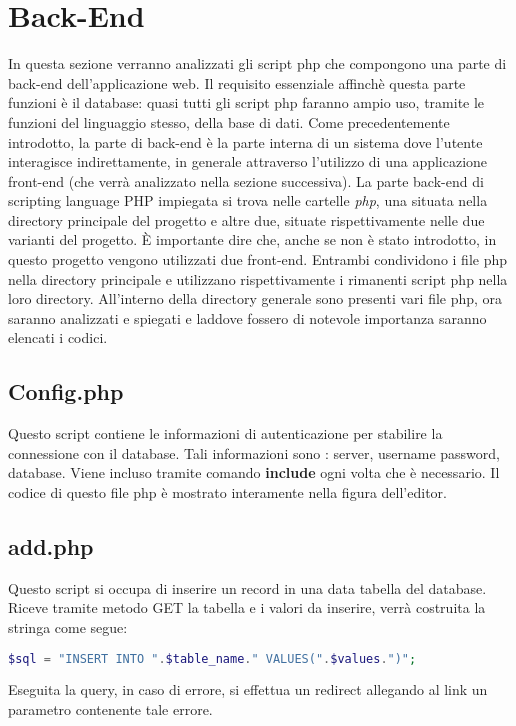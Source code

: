 \section{Back-End}
In questa sezione verranno analizzati gli script php che compongono una parte di back-end dell'applicazione web. \newline
Il requisito essenziale affinchè questa parte funzioni è il database: quasi tutti gli script php faranno ampio uso, tramite le funzioni del linguaggio stesso, della base di dati. \newline \newline
Come precedentemente introdotto, la parte di back-end è la parte interna di un sistema dove l'utente interagisce indirettamente, in generale attraverso l'utilizzo di una applicazione front-end (che verrà analizzato nella sezione successiva). \newline
La parte back-end di scripting language PHP impiegata si trova nelle cartelle \textit{php}, una situata nella directory principale del progetto e altre due, situate rispettivamente nelle due varianti del progetto. \newline
È importante dire che, anche se non è stato introdotto, in questo progetto vengono utilizzati due front-end. Entrambi condividono i file php nella directory principale e utilizzano rispettivamente i rimanenti script php nella loro directory.
\newline
All'interno della directory generale sono presenti vari file php, ora saranno analizzati e spiegati e laddove fossero di notevole importanza saranno elencati i codici.


\subsection{Config.php}
Questo script contiene le informazioni di autenticazione per stabilire la connessione con il database. Tali informazioni sono : server, username password, database.\newline
Viene incluso tramite comando \textbf{include} ogni volta che è necessario. \newline
Il codice di questo file php è mostrato interamente nella figura dell'editor.

\subsection{add.php}
Questo script si occupa di inserire un record in una data tabella del database.
Riceve tramite metodo GET la tabella e i valori da inserire, verrà costruita la stringa come segue:
\begin{lstlisting}[language=PHP]
$sql = "INSERT INTO ".$table_name." VALUES(".$values.")";
\end{lstlisting}
Eseguita la query, in caso di errore, si effettua un redirect allegando al link un parametro contenente tale errore.


